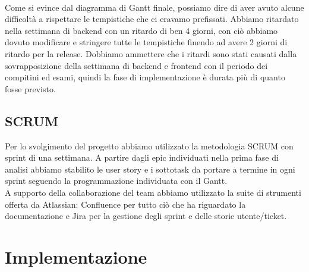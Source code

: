 \documentclass{article}
\begin{document}
\\
Come si evince dal diagramma di Gantt finale, possiamo dire di aver avuto alcune difficoltà a rispettare le tempistiche che ci eravamo prefissati. Abbiamo ritardato nella settimana di backend con un ritardo di ben 4 giorni, con ciò abbiamo dovuto modificare e stringere tutte le tempistiche finendo ad avere 2 giorni di ritardo per la release. Dobbiamo ammettere che i ritardi sono stati causati dalla sovrapposizione della settimana di backend e frontend con il periodo dei compitini ed esami, quindi la fase di implementazione è durata più di quanto fosse previsto.

\subsection{SCRUM}
Per lo svolgimento del progetto abbiamo utilizzato la metodologia SCRUM con sprint di una settimana. A partire dagli epic individuati nella prima fase di analisi abbiamo stabilito le user story e i sottotask da portare a termine in ogni sprint seguendo la programmazione individuata con il Gantt.\\
A supporto della collaborazione del team abbiamo utilizzato la suite di strumenti offerta da Atlassian: Confluence per tutto ciò che ha riguardato la documentazione e Jira per la gestione degli sprint e delle storie utente/ticket.
\clearpage
\section{Implementazione}
\end{document}
